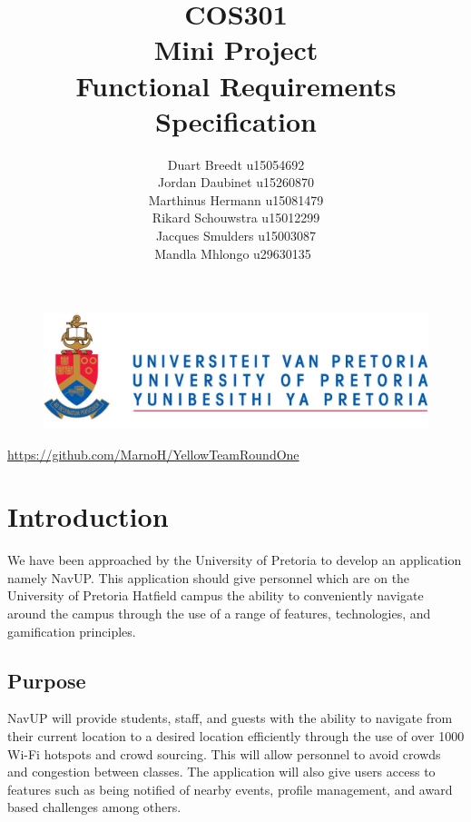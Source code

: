 \documentclass[12pt]{article}
\begin{document}
	

	\begin{figure}
		\includegraphics[width=\linewidth]{logo.jpg}	
	\end{figure}

	\title 	{
				COS301\\
				Mini Project\\
				Functional Requirements Specification
		   	}
	\author {
				Duart Breedt u15054692\\
				Jordan Daubinet u15260870\\
				Marthinus Hermann u15081479\\
				Rikard Schouwstra u15012299\\
				Jacques Smulders u15003087\\
				Mandla Mhlongo u29630135\
			}
	\maketitle
	\begin{center}
			\url{https://github.com/MarnoH/YellowTeamRoundOne}	
	\end{center}
	\newpage
	\tableofcontents
	\newpage
	\section{Introduction}
		We have been approached by the University of Pretoria to develop an application namely NavUP. This application should give personnel which are on the University of Pretoria Hatfield campus the ability to conveniently navigate around the campus through the use of a range of features, technologies, and gamification principles.
		
	\subsection{Purpose}
		NavUP will provide students, staff, and guests with the ability to navigate from their current location to a desired location efficiently through the use of over 1000 Wi-Fi hotspots and crowd sourcing. This will allow personnel to avoid crowds and congestion between classes. The application will also give users access to features such as being notified of nearby events, profile management, and award based challenges among others.
		
\end{document}
